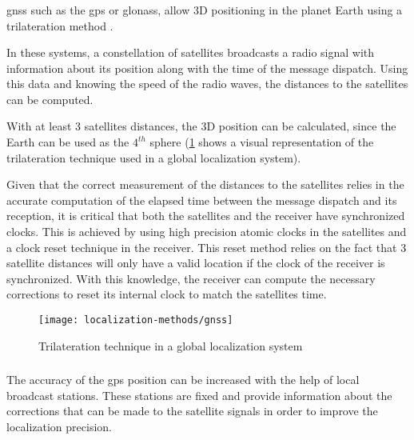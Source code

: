 \subsubsection{}

\gls{gnss} such as the \gls{gps} or \gls{glonass}, allow 3D positioning in the planet Earth  using a trilateration method \cite{Knedlik2007}.

In these systems, a constellation of satellites broadcasts a radio signal with information about its position along with the time of the message dispatch. Using this data and knowing the speed of the radio waves, the distances to the satellites can be computed.

With at least 3 satellites distances, the 3D position can be calculated, since the Earth can be used as the ${4}^{th}$ sphere (\cref{fig:localization-methods_gnss} shows a visual representation of the trilateration technique used in a global localization system).

Given that the correct measurement of the distances to the satellites relies in the accurate computation of the elapsed time between the message dispatch and its reception, it is critical that both the satellites and the receiver have synchronized clocks. This is achieved by using high precision atomic clocks in the satellites and a clock reset technique in the receiver. This reset method relies on the fact that 3 satellite distances will only have a valid location if the clock of the receiver is synchronized. With this knowledge, the receiver can compute the necessary corrections to reset its internal clock to match the satellites time.

\begin{figure}[H]
	\centering
	\texttt{[image: localization-methods/gnss]}
	\caption[Trilateration technique in a global localization system]{Trilateration technique in a global localization system\protect\footnotemark}
	\label{fig:localization-methods_gnss}
\end{figure}


\subsubsection{}

The accuracy of the \gls{gps} position can be increased with the help of local broadcast stations. These stations are fixed and provide information about the corrections that can be made to the satellite signals in order to improve the localization precision.

